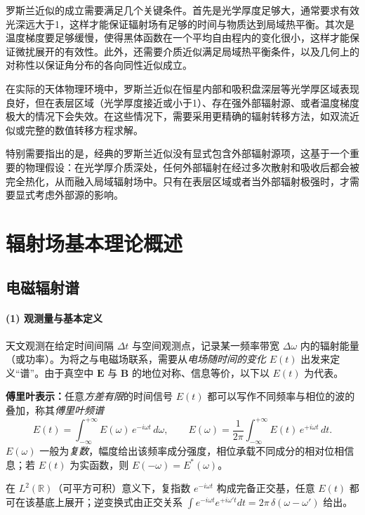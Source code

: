 罗斯兰近似的成立需要满足几个关键条件。首先是光学厚度足够大，通常要求有效光深远大于1，这样才能保证辐射场有足够的时间与物质达到局域热平衡。其次是温度梯度要足够缓慢，使得黑体函数在一个平均自由程内的变化很小，这样才能保证微扰展开的有效性。此外，还需要介质近似满足局域热平衡条件，以及几何上的对称性以保证角分布的各向同性近似成立。

在实际的天体物理环境中，罗斯兰近似在恒星内部和吸积盘深层等光学厚区域表现良好，但在表层区域（光学厚度接近或小于1）、存在强外部辐射源、或者温度梯度极大的情况下会失效。在这些情况下，需要采用更精确的辐射转移方法，如双流近似或完整的数值转移方程求解。

特别需要指出的是，经典的罗斯兰近似没有显式包含外部辐射源项，这基于一个重要的物理假设：在光学厚介质深处，任何外部辐射在经过多次散射和吸收后都会被完全热化，从而融入局域辐射场中。只有在表层区域或者当外部辐射极强时，才需要显式考虑外部源的影响。


\section{辐射场基本理论概述}
\subsection{电磁辐射谱}

\paragraph{(1) 观测量与基本定义}
天文观测在给定时间间隔 $\Delta t$ 与空间观测点，记录某一频率带宽 $\Delta\omega$ 内的辐射能量（或功率）。为将之与电磁场联系，需要从\emph{电场随时间的变化} $E(t)$ 出发来定义“谱”。由于真空中 $\mathbf{E}$ 与 $\mathbf{B}$ 的地位对称、信息等价，以下以 $E(t)$ 为代表。

\medskip
\noindent
\textbf{傅里叶表示：}任意\emph{方差有限}的时间信号 $E(t)$ 都可以写作不同频率与相位的波的叠加，称其\emph{傅里叶频谱}
\begin{equation}
  E(t) = \int_{-\infty}^{+\infty} E(\omega)\,e^{-i\omega t}\,d\omega ,
  \qquad
  E(\omega) = \frac{1}{2\pi}\int_{-\infty}^{+\infty} E(t)\,e^{+i\omega t}\,dt .
\end{equation}
$E(\omega)$ 一般为\emph{复数}，幅度给出该频率成分强度，相位承载不同成分的相对位相信息；若 $E(t)$ 为实函数，则 $E(-\omega)=E^*(\omega)$。

\begin{derivationnote}[为何可以用傅里叶积分展开？]
在 $L^2(\mathbb{R})$（可平方可积）意义下，复指数 $e^{-i\omega t}$ 构成完备正交基，任意 $E(t)$ 都可在该基底上展开；逆变换式由正交关系
$\int e^{-i\omega t}e^{+i\omega' t}dt=2\pi\,\delta(\omega-\omega')$ 给出。
\end{derivationnote}

